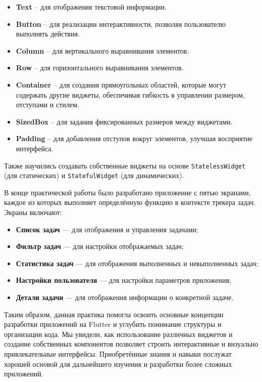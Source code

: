 \begin{itemize}
	\item \textbf{Text} -- для отображения текстовой информации.
	\item \textbf{Button} -- для реализации интерактивности,
		позволяя пользователю выполнять действия.
	\item \textbf{Column} -- для вертикального выравнивания элементов.
	\item \textbf{Row} -- для горизонтального выравнивания элементов.
	\item \textbf{Container} -- для создания прямоугольных областей,
		которые могут содержать другие виджеты,
		обеспечивая гибкость в управлении размером, отступами и стилем.
	\item \textbf{SizedBox} -- для задания фиксированных размеров
		между виджетами.
	\item \textbf{Padding} -- для добавления отступов вокруг элементов,
		улучшая восприятие интерфейса.
\end{itemize}

Также научились создавать собственные виджеты
на основе \texttt{StatelessWidget} (для статических)
и \texttt{StatefulWidget} (для динамических).

В конце практической работы было разработано приложение с пятью экранами,
каждое из которых выполняет определённую функцию в контексте трекера задач.
Экраны включают:

\begin{itemize}
	\item \textbf{Список задач} --- для отображения и управления задачами;
	\item \textbf{Фильтр задач} --- для настройки отображаемых задач;
	\item \textbf{Статистика задач} --- для отображения выполненных
		и невыполненных задач;
	\item \textbf{Настройки пользователя} --- для настройки
		параметров приложения;
	\item \textbf{Детали задачи} --- для отображения информации
		о конкретной задаче.
\end{itemize}

Таким образом, данная практика помогла освоить основные концепции разработки
приложений на Flutter и углубить понимание структуры и организации кода.
Мы увидели, как использование различных виджетов
и создание собственных компонентов позволяет строить интерактивные
и визуально привлекательные интерфейсы.
Приобретённые знания и навыки послужат хорошей основой
для дальнейшего изучения и разработки более сложных приложений.

